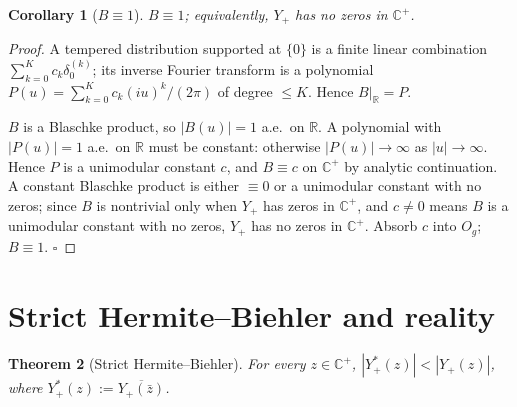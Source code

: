 \documentclass[11pt]{article}
\newtheorem{theorem}{Theorem}
\newtheorem{corollary}[theorem]{Corollary}
\theoremstyle{definition}
\newcommand{\R}{\mathbb{R}}
\newcommand{\C}{\mathbb{C}}
\newcommand{\Cp}{\C^{+}}
\begin{document}
\begin{corollary}[$B\equiv 1$]\label{cor:Btrivial}
$B\equiv 1$; equivalently, $Y_+$ has no zeros in $\Cp$.
\end{corollary}

\begin{proof}
A tempered distribution supported at $\{0\}$ is a finite linear combination $\sum_{k=0}^K c_k\delta_0^{(k)}$; its inverse Fourier transform is a polynomial $P(u)=\sum_{k=0}^K c_k(iu)^k/(2\pi)$ of degree $\le K$. Hence $B|_\R=P$.

$B$ is a Blaschke product, so $|B(u)|=1$ a.e.\ on $\R$. A polynomial with $|P(u)|=1$ a.e.\ on $\R$ must be constant: otherwise $|P(u)|\to\infty$ as $|u|\to\infty$. Hence $P$ is a unimodular constant $c$, and $B\equiv c$ on $\Cp$ by analytic continuation. A constant Blaschke product is either $\equiv 0$ or a unimodular constant with no zeros; since $B$ is nontrivial only when $Y_+$ has zeros in $\Cp$, and $c\ne 0$ means $B$ is a unimodular constant with no zeros, $Y_+$ has no zeros in $\Cp$. Absorb $c$ into $O_g$; $B\equiv 1$. $\square$
\end{proof}

\section{Strict Hermite--Biehler and reality}

\begin{theorem}[Strict Hermite--Biehler]\label{thm:HB}
For every $z\in\Cp$, $|Y_+^*(z)|<|Y_+(z)|$, where $Y_+^*(z):=\overline{Y_+(\bar z)}$.
\end{theorem}
\end{document}
